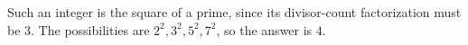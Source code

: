 Such an integer is the square of a prime, since its divisor-count factorization must be $3$. The possibilities are $2^2,3^2,5^2,7^2$, so the answer is $\boxed4$.
